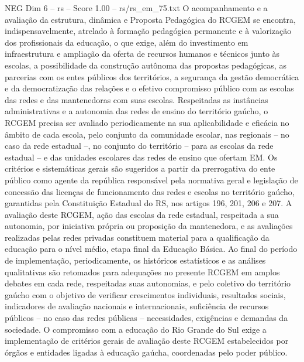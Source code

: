 \begin{textsample}{NEG Dim 6 – rs – Score 1.00 – rs/rs\_em\_75.txt}
O acompanhamento e a avaliação da estrutura, dinâmica e Proposta Pedagógica do RCGEM se encontra, indispensavelmente, atrelado à formação pedagógica permanente e à valorização dos profissionais da educação, o que exige, além do investimento em infraestrutura e ampliação da oferta de recursos humanos e técnicos junto às escolas, a possibilidade da construção autônoma das propostas pedagógicas, as parcerias com os entes públicos dos territórios, a segurança da gestão democrática e da democratização das relações e o efetivo compromisso público com as escolas das redes e das mantenedoras com suas escolas.
Respeitadas as instâncias administrativas e a autonomia das redes de ensino do território gaúcho, o RCGEM precisa ser avaliado periodicamente na sua aplicabilidade e eficácia no âmbito de cada escola, pelo conjunto da comunidade escolar, nas regionais – no caso da rede estadual –, no conjunto do território – para as escolas da rede estadual – e das unidades escolares das redes de ensino que ofertam EM.
Os critérios e sistemáticas gerais são sugeridos a partir da prerrogativa do ente público como agente da república responsável pela normativa geral e legislação de concessão das licenças de funcionamento das redes e escolas no território gaúcho, garantidas pela Constituição Estadual do RS, nos artigos 196, 201, 206 e 207.
A avaliação deste RCGEM, ação das escolas da rede estadual, respeitada a sua autonomia, por iniciativa própria ou proposição da mantenedora, e as avaliações realizadas pelas redes privadas constituem material para a qualificação da educação para o nível médio, etapa final da Educação Básica.
Ao final do período de implementação, periodicamente, os históricos estatísticos e as análises qualitativas são retomados para adequações no presente RCGEM em amplos debates em cada rede, respeitadas suas autonomias, e pelo coletivo do território gaúcho com o objetivo de verificar crescimentos individuais, resultados sociais, indicadores de avaliação nacionais e internacionais, suficiência de recursos públicos – no caso das redes públicas – necessidades, exigências e demandas da sociedade.
O compromisso com a educação do Rio Grande do Sul exige a implementação de critérios gerais de avaliação deste RCGEM estabelecidos por órgãos e entidades ligadas à educação gaúcha, coordenadas pelo poder público.

\end{textsample}
